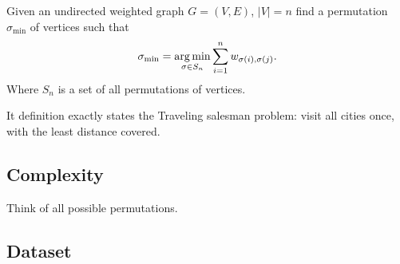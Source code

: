 	\begin{definition}
		Given an undirected weighted graph $G = (V, E)$, $|V| = n$ find a permutation $\sigma_{\min}$ of vertices such that
		\begin{equation*}
			\sigma_{\min} = \underset{\sigma \in S_n}{\operatorname*{arg\,min}} \sum_{i=1}^{n} w_{\sigma(i), \sigma(j)}.
		\end{equation*}
		Where $S_n$ is a set of all permutations of vertices.
	\end{definition}
	It definition exactly states the Traveling salesman problem: visit all cities once, with the least distance covered.
	
\subsection{Complexity}
	Think of all possible permutations.

\subsection{Dataset}